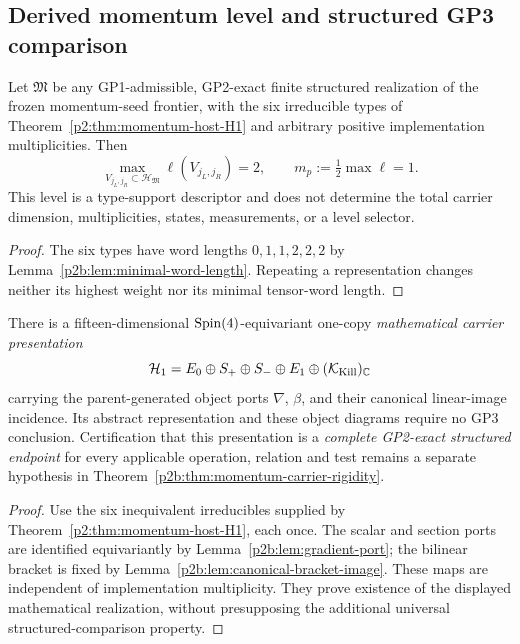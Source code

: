 \documentclass[12pt,a4paper]{article}
\begin{document}
\subsection{Derived momentum level and structured GP3 comparison}

\begin{corollary}
\label{p2:thm:m1-component}
Let \(\mathfrak M\) be any GP1-admissible, GP2-exact finite structured
realization of the frozen momentum-seed frontier, with the six irreducible
types of Theorem~\ref{p2:thm:momentum-host-H1} and arbitrary positive
implementation multiplicities.  Then
\[
 \max_{V_{j_L,j_R}\subset\mathcal H_{\mathfrak M}}
 \ell(V_{j_L,j_R})=2,\qquad
 \boxed{m_p:=\tfrac12\max\ell=1}.
\]
This level is a type-support descriptor and does not determine the total
carrier dimension, multiplicities, states, measurements, or a level selector.
\end{corollary}
\begin{proof}
The six types have word lengths \(0,1,1,2,2,2\) by
Lemma~\ref{p2b:lem:minimal-word-length}.  Repeating a representation
changes neither its highest weight nor its minimal tensor-word length.
\end{proof}

\begin{proposition}
\label{p2b:prop:one-copy-geometric-module}
There is a fifteen-dimensional \(\mathrm{Spin}(4)\)-equivariant one-copy
\emph{mathematical carrier presentation}
\[
 \mathcal H_1=E_0\oplus S_+\oplus S_-\oplus E_1
 \oplus(\mathcal K_{\rm Kill})_{\mathbb C}
\]
carrying the parent-generated object ports \(\nabla\), \(\beta\), and
their canonical linear-image incidence.  Its abstract representation
and these object diagrams require no GP3 conclusion.  Certification that
this presentation is a \emph{complete GP2-exact structured endpoint}
for every applicable operation, relation and test remains a separate
hypothesis in Theorem~\ref{p2b:thm:momentum-carrier-rigidity}.
\end{proposition}
\begin{proof}
Use the six inequivalent irreducibles supplied by
Theorem~\ref{p2:thm:momentum-host-H1}, each once.  The scalar and section
ports are identified equivariantly by Lemma~\ref{p2b:lem:gradient-port};
the bilinear bracket is fixed by Lemma~\ref{p2b:lem:canonical-bracket-image}.
These maps are independent of implementation multiplicity.  They prove
existence of the displayed mathematical realization, without presupposing
the additional universal structured-comparison property.
\end{proof}
\end{document}
